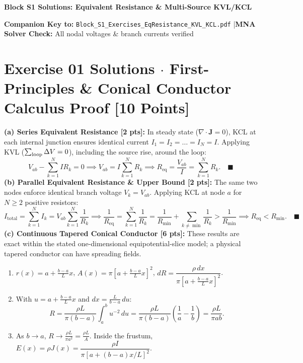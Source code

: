 \documentclass[10pt,letterpaper]{article}
\begin{document}
{\color{ink}\sffamily\bfseries\LARGE Block S1 Solutions: Equivalent Resistance \& Multi-Source KVL/KCL}\par
\textbf{Companion Key to:} \texttt{Block\_S1\_Exercises\_EqResistance\_KVL\_KCL.pdf} \quad|\quad \textbf{MNA Solver Check:} All nodal voltages \& branch currents verified

\section*{Exercise 01 Solutions $\cdot$ First-Principles \& Conical Conductor Calculus Proof \hfill [10 Points]}
\textbf{(a) Series Equivalent Resistance [2 pts]:} In steady state ($\nabla\cdot\mathbf{J}=0$), KCL at each internal junction ensures identical current $I_1 = I_2 = \dots = I_N = I$. Applying KVL ($\sum_{\rm loop}\Delta V=0$), including the source rise, around the loop:
\[
  V_{ab} - \sum_{k=1}^N I R_k = 0 \implies V_{ab} = I \sum_{k=1}^N R_k \implies R_{\text{eq}} = \frac{V_{ab}}{I} = \sum_{k=1}^N R_k. \quad \blacksquare
\]
\textbf{(b) Parallel Equivalent Resistance \& Upper Bound [2 pts]:} The same two nodes enforce identical branch voltage $V_k = V_{ab}$. Applying KCL at node $a$ for $N\ge2$ positive resistors:
\[
  I_{\text{total}} = \sum_{k=1}^N I_k = V_{ab}\sum_{k=1}^N \frac{1}{R_k} \implies \frac{1}{R_{\text{eq}}} = \sum_{k=1}^N \frac{1}{R_k} = \frac{1}{R_{\min}} + \sum_{k\neq\min}\frac{1}{R_k} > \frac{1}{R_{\min}} \implies R_{\text{eq}} < R_{\min}. \quad \blacksquare
\]
\textbf{(c) Continuous Tapered Conical Conductor [6 pts]:} These results are exact within the stated one-dimensional equipotential-slice model; a physical tapered conductor can have spreading fields.
\begin{enumerate}
  \item[(i)] $r(x) = a + \frac{b-a}{L}x$, \quad $A(x) = \pi\left[a + \frac{b-a}{L}x\right]^2$, \quad $dR = \dfrac{\rho\,dx}{\pi\left[a + \frac{b-a}{L}x\right]^2}$.
  \item[(ii)] With $u = a + \frac{b-a}{L}x$ and $dx = \frac{L}{b-a}\,du$:
  \[
    R = \frac{\rho L}{\pi(b-a)}\int_a^b u^{-2}\,du = \frac{\rho L}{\pi(b-a)}\left(\frac{1}{a}-\frac{1}{b}\right) = \frac{\rho L}{\pi a b}.
  \]
  \item[(iii)] As $b \to a$, $R \to \frac{\rho L}{\pi a^2} = \frac{\rho L}{A}$. Inside the frustum, $E(x) = \rho J(x) = \dfrac{\rho I}{\pi[a + (b-a)x/L]^2}$.
\end{enumerate}
\end{document}

